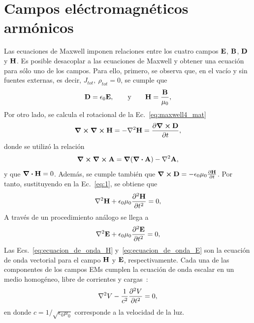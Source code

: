 \section{Campos eléctromagnéticos armónicos}
Las ecuaciones de Maxwell imponen relaciones entre los cuatro campos $\vb{E}$, $\vb{B}$, $\vb{D}$ y $\vb{H}$. Es posible desacoplar a las ecuaciones de Maxwell y obtener una ecuación para sólo uno de los campos. Para ello, primero, se observa que, en el vacío y sin fuentes externas, es decir, $J_{tot},\:\rho_{tot}=0$, se cumple que
\begin{eqnarray}
	\vb{D}=\epsilon_{0}\vb{E},\qquad\text{y}\qquad\vb{H}=\frac{\vb{B}}{\mu_{0}},
\end{eqnarray}
Por otro lado, se calcula el rotacional de la Ec.~\eqref{eq:maxwell4_mat}
\begin{equation}
	\curl \curl \vb{H}= - \laplacian \vb{H}= \pdv{\curl\vb{D}}{t},\label{eq:1}
\end{equation}
donde se utilizó la relación~\cite{Griffiths}
\begin{equation}
\curl\curl\vb{A}= \grad(\div \vb{A}) - \laplacian \vb{A},\label{eq:propiedad}
\end{equation}
y que $\div \vb{H}=0$. Además, se cumple también que $\curl\vb{D}=-\epsilon_{0}\mu_{0}\pdv{\vb{H}}{t}$. Por tanto, sustituyendo en la Ec.~\eqref{eq:1}, se obtiene que~\cite{Griffiths}
\begin{equation}
\laplacian{\vb{H}}+\epsilon_{0}\mu_{0}\pdv[2]{\vb{H}}{t}=0,\label{eq:ecuacion_de_onda_H}
\end{equation}
A través de un procedimiento análogo se llega a
\begin{equation}
		\laplacian{\vb{E}}+\epsilon_{0}\mu_{0}\pdv[2]{\vb{E}}{t}=0, \label{eq:ecuacion_de_onda_E}
\end{equation}
Las Ecs.~\eqref{eq:ecuacion_de_onda_H} y~\eqref{eq:ecuacion_de_onda_E} son la ecuación de onda vectorial para el campo $\vb{H}$ y $\vb{E}$, respectivamente. Cada una de las componentes de los campos EMs cumplen la ecuación de onda escalar en un medio homogéneo, libre de corrientes y cargas~\cite{BornWolf1980}:
\begin{equation}
	\laplacian V-\frac{1}{c^{2}}\pdv[2]{V}{t}=0,
\end{equation}
en donde $c=1/\sqrt{\epsilon_{0}\mu_{0}}$ corresponde a la velocidad de la luz.


